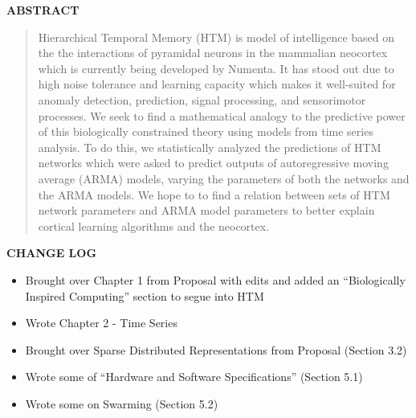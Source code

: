 \documentclass[oneside,12pt,openany]{book}
\begin{document}
	\begin{center}
		\textbf{ABSTRACT}
		
		\begin{quotation}
			\noindent Hierarchical Temporal Memory (HTM) is model of intelligence based on the the interactions of pyramidal neurons in the mammalian neocortex which is currently being developed by Numenta. It has stood out due to high noise tolerance and learning capacity which makes it well-suited for anomaly detection, prediction, signal processing, and sensorimotor processes. We seek to find a mathematical analogy to the predictive power of this biologically constrained theory using models from time series analysis. To do this, we statistically analyzed the predictions of HTM networks which were asked to predict outputs of autoregressive moving average (ARMA) models, varying the parameters of both the networks and the ARMA models. We hope to to find a relation between sets of HTM network parameters and ARMA model parameters to better explain cortical learning algorithms and the neocortex.
		\end{quotation}
		
	\end{center}
	\vfill
	\pagebreak
	\setcounter{tocdepth}{1}
	\listoffigures
	\vfill
	\pagebreak
	
	\listoftables
	\vfill
	\pagebreak
	
	
	\begin{center}
		\textbf{\LARGE CHANGE LOG}
	\end{center}
	\begin{itemize}
		\item Brought over Chapter 1 from Proposal with edits and added an ``Biologically Inspired Computing'' section to segue into HTM
		\item Wrote Chapter 2 - Time Series
		\item Brought over Sparse Distributed Representations from Proposal (Section 3.2) 
		\item Wrote some of ``Hardware and Software Specifications'' (Section 5.1)
		\item Wrote some on Swarming (Section 5.2)
	\end{itemize}
	
	
	\vfill
	\pagebreak
	
	\mainmatter
\end{document}

